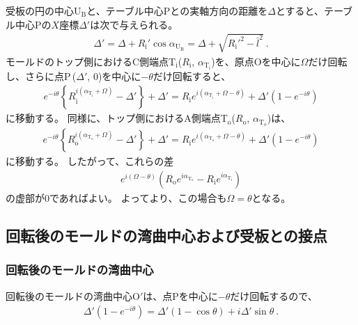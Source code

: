 受板の円の中心U$_\mathrm B$と、テーブル中心Pとの実軸方向の距離を$\varDelta$とすると、テーブル中心Pの$X$座標$\varDelta'$は次で与えられる。
\begin{align}
  \label{eq:tableCenter}
  \varDelta'
  = \varDelta+R_\mathrm i'\cos\alpha_{\mathrm U_\mathrm B} = \varDelta+\sqrt{R_\mathrm i'^2-\bar l^2}\ .
\end{align}
モールドのトップ側におけるC側端点T$_\mathrm i$($R_\mathrm i$, $\alpha_{\mathrm T_\mathrm i}$)を、原点Oを中心に$\Omega$だけ回転し、さらに点P\,($\varDelta'$, $0$)を中心に$-\theta$だけ回転すると、
\begin{align}
  \label{eq:afterfttable}
  e^{-i\theta}\left\{R_\mathrm i^{i(\alpha_{\mathrm T_\mathrm i}+\Omega)}-\varDelta'\right\}+\varDelta'
  = R_\mathrm ie^{i(\alpha_{\mathrm T_\mathrm i}+\Omega-\theta)}+\varDelta'\left(1-e^{-i\theta}\right)
\end{align}
に移動する。
同様に、トップ側におけるA側端点T$_\mathrm o$($R_\mathrm o$, $\alpha_{\mathrm T_\mathrm o}$)は、
\begin{align*}
  e^{-i\theta}\!\left\{R_\mathrm o^{i(\alpha_{\mathrm T_\mathrm o}+\Omega)}-\varDelta'\right\}+\varDelta'
  = R_\mathrm ie^{i(\alpha_{\mathrm T_\mathrm o}+\Omega-\theta)}+\varDelta'\!\left(1-e^{-i\theta}\right)
\end{align*}
に移動する。
したがって、これらの差
\begin{align*}
  e^{i(\Omega-\theta)}\!
  \left(R_\mathrm oe^{i\alpha_{\mathrm T_\mathrm o}}-R_\mathrm ie^{i\alpha_{\mathrm T_\mathrm i}}\right)
\end{align*}
の虚部が$0$であればよい。
よってより、この場合も$\Omega = \theta$となる。



\subsection{回転後のモールドの湾曲中心および受板との接点}


\subsubsection{回転後のモールドの湾曲中心}
回転後のモールドの湾曲中心O$'$は、点Pを中心に$-\theta$だけ回転するので、
\begin{align*}
  \varDelta'\!\left(1-e^{-i\theta}\right) = \varDelta'(1-\cos\theta)+i\varDelta'\sin\theta\ .
\end{align*}


